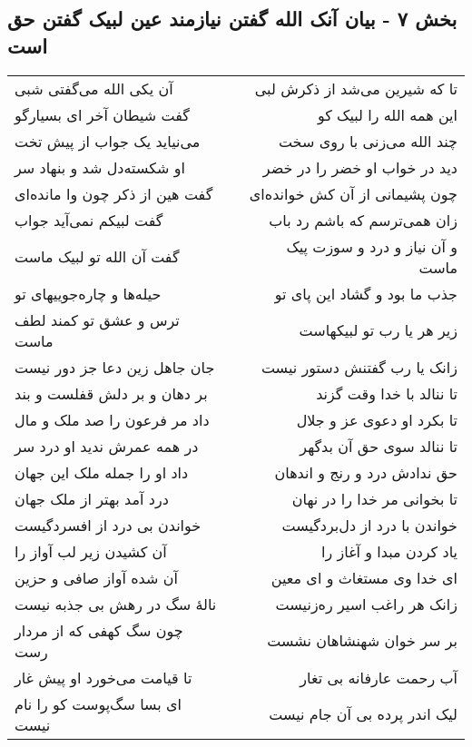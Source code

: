 \begin{center}
\section*{بخش ۷ - بیان آنک الله گفتن نیازمند عین لبیک گفتن حق است}
\label{sec:sh007}
\begin{longtable}{l p{0.5cm} r}
آن یکی الله می‌گفتی شبی
&&
تا که شیرین می‌شد از ذکرش لبی
\\
گفت شیطان آخر ای بسیارگو
&&
این همه الله را لبیک کو
\\
می‌نیاید یک جواب از پیش تخت
&&
چند الله می‌زنی با روی سخت
\\
او شکسته‌دل شد و بنهاد سر
&&
دید در خواب او خضر را در خضر
\\
گفت هین از ذکر چون وا مانده‌ای
&&
چون پشیمانی از آن کش خوانده‌ای
\\
گفت لبیکم نمی‌آید جواب
&&
زان همی‌ترسم که باشم رد باب
\\
گفت آن الله تو لبیک ماست
&&
و آن نیاز و درد و سوزت پیک ماست
\\
حیله‌ها و چاره‌جوییهای تو
&&
جذب ما بود و گشاد این پای تو
\\
ترس و عشق تو کمند لطف ماست
&&
زیر هر یا رب تو لبیکهاست
\\
جان جاهل زین دعا جز دور نیست
&&
زانک یا رب گفتنش دستور نیست
\\
بر دهان و بر دلش قفلست و بند
&&
تا ننالد با خدا وقت گزند
\\
داد مر فرعون را صد ملک و مال
&&
تا بکرد او دعوی عز و جلال
\\
در همه عمرش ندید او درد سر
&&
تا ننالد سوی حق آن بدگهر
\\
داد او را جمله ملک این جهان
&&
حق ندادش درد و رنج و اندهان
\\
درد آمد بهتر از ملک جهان
&&
تا بخوانی مر خدا را در نهان
\\
خواندن بی درد از افسردگیست
&&
خواندن با درد از دل‌بردگیست
\\
آن کشیدن زیر لب آواز را
&&
یاد کردن مبدا و آغاز را
\\
آن شده آواز صافی و حزین
&&
ای خدا وی مستغاث و ای معین
\\
نالهٔ سگ در رهش بی جذبه نیست
&&
زانک هر راغب اسیر ره‌زنیست
\\
چون سگ کهفی که از مردار رست
&&
بر سر خوان شهنشاهان نشست
\\
تا قیامت می‌خورد او پیش غار
&&
آب رحمت عارفانه بی تغار
\\
ای بسا سگ‌پوست کو را نام نیست
&&
لیک اندر پرده بی آن جام نیست
\\

\end{longtable}
\end{center}

